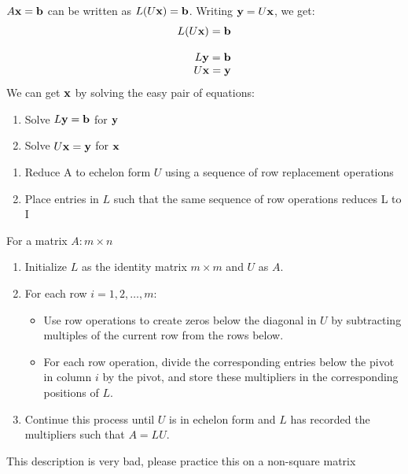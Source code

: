 \documentclass{report}
\begin{document}
$A\mathbf{x} = \mathbf{b}$ can be written as $L(U\mathbf{x}) = \mathbf{b}$. Writing $\mathbf{y} = U\mathbf{x}$, we get:
\[
\begin{array}{rlr}
    L(U\mathbf{x}) = \mathbf{b} \\\\
    L\mathbf{y} = \mathbf{b} \\
    U\mathbf{x} = \mathbf{y}
\end{array}
\]
We can get $\mathbf{x}$ by solving the easy pair of equations:
\begin{enumerate}
    \item Solve $L\mathbf{y} = \mathbf{b}$ for $\mathbf{y}$
    \item Solve $U\mathbf{x} = \mathbf{y}$ for $\mathbf{x}$
\end{enumerate}

\begin{tcolorbox}[colback=blue!5!white, colframe=blue!75!black, title=LU Factorization Algorithm (boring)]
\begin{enumerate}
    \item Reduce A to echelon form $U$ using a sequence of row replacement operations
    \item Place entries in $L$ such that the same sequence of row operations reduces L to I
\end{enumerate}
\end{tcolorbox}

\begin{tcolorbox}[colback=blue!5!white, colframe=yellow!75!black, title=LU Factorization Algorithm (fast)]
For a matrix $A: m \times n$
\begin{enumerate}
    \item Initialize $L$ as the identity matrix $m \times m$ and $U$ as $A$.
    \item For each row $i = 1, 2, \dots, m$:
    \begin{itemize}
        \item Use row operations to create zeros below the diagonal in $U$ by subtracting multiples of the current row from the rows below.
        \item For each row operation, divide the corresponding entries below the pivot in column $i$ by the pivot, and store these multipliers in the corresponding positions of $L$.
    \end{itemize}
    \item Continue this process until $U$ is in echelon form and $L$ has recorded the multipliers such that $A = LU$.
\end{enumerate}
\end{tcolorbox}
This description is very bad, please practice this on a non-square matrix 
\end{document}
